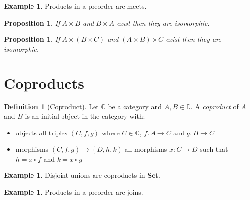 \documentclass{article}
\newtheorem{proposition}[axiom]{Proposition}
\theoremstyle{definition}
\newtheorem{definition}[axiom]{Definition}
\newtheorem{example}[axiom]{Example}
\begin{document}
\begin{example}
    Products in a preorder are meets.
\end{example}

\begin{proposition}
    If $A \times B$ and $B \times A$ exist then they are isomorphic.
\end{proposition}

\begin{proposition}
    If $A \times (B \times C)$ and $(A \times B) \times C$ exist then they are isomorphic.
\end{proposition}
\section{Coproducts}

\begin{definition}[Coproduct]
    Let $\mathbb{C}$ be a category and $A, B \in \mathbb{C}$. A \emph{coproduct} of $A$
    and $B$ is an initial object in the category with:
    \begin{itemize}
        \item objects all triples $(C,f,g)$ where $C \in \mathbb{C}$, $f : A \rightarrow
        C$ and $g : B \rightarrow C$
        \item morphisms $(C,f,g) \rightarrow (D,h,k)$ all morphisms $x : C \rightarrow D$
        such that $h = x \circ f$ and $k = x \circ g$
    \end{itemize}
\end{definition}

\begin{example}
    Disjoint unions are coproducts in $\mathbf{Set}$.
\end{example}

\begin{example}
    Products in a preorder are joins.
\end{example}
\end{document}

